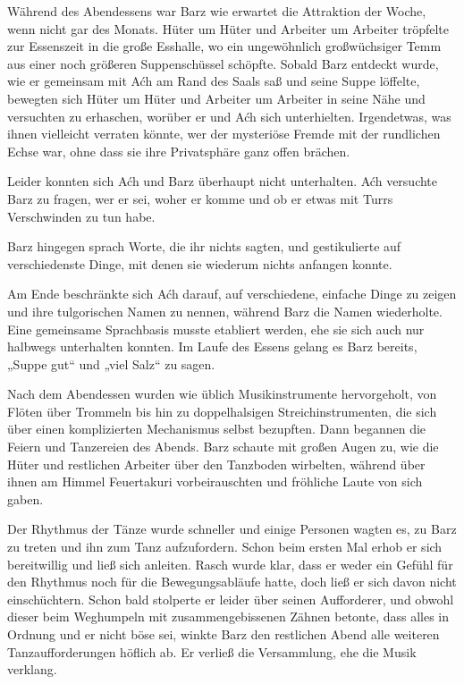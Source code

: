 Während des Abendessens war Barz wie erwartet die Attraktion der Woche, wenn nicht gar des Monats. Hüter um Hüter und Arbeiter um Arbeiter tröpfelte zur Essenszeit in die große Esshalle, wo ein ungewöhnlich großwüchsiger Temm aus einer noch größeren Suppenschüssel schöpfte. Sobald Barz entdeckt wurde, wie er gemeinsam mit Aćh am Rand des Saals saß und seine Suppe löffelte, bewegten sich Hüter um Hüter und Arbeiter um Arbeiter in seine Nähe und versuchten zu erhaschen, worüber er und Aćh sich unterhielten. Irgendetwas, was ihnen vielleicht verraten könnte, wer der mysteriöse Fremde mit der rundlichen Echse war, ohne dass sie ihre Privatsphäre ganz offen brächen.

Leider konnten sich Aćh und Barz überhaupt nicht unterhalten. Aćh versuchte Barz zu fragen, wer er sei, woher er komme und ob er etwas mit Turrs Verschwinden zu tun habe.

Barz hingegen sprach Worte, die ihr nichts sagten, und gestikulierte auf verschiedenste Dinge, mit denen sie wiederum nichts anfangen konnte.

Am Ende beschränkte sich Aćh darauf, auf verschiedene, einfache Dinge zu zeigen und ihre tulgorischen Namen zu nennen, während Barz die Namen wiederholte. Eine gemeinsame Sprachbasis musste etabliert werden, ehe sie sich auch nur halbwegs unterhalten konnten. Im Laufe des Essens gelang es Barz bereits, „Suppe gut“ und „viel Salz“ zu sagen.

Nach dem Abendessen wurden wie üblich Musikinstrumente hervorgeholt, von Flöten über Trommeln bis hin zu doppelhalsigen Streichinstrumenten, die sich über einen komplizierten Mechanismus selbst bezupften. Dann begannen die Feiern und Tanzereien des Abends. Barz schaute mit großen Augen zu, wie die Hüter und restlichen Arbeiter über den Tanzboden wirbelten, während über ihnen am Himmel Feuertakuri vorbeirauschten und fröhliche Laute von sich gaben.

Der Rhythmus der Tänze wurde schneller und einige Personen wagten es, zu Barz zu treten und ihn zum Tanz aufzufordern. Schon beim ersten Mal erhob er sich bereitwillig und ließ sich anleiten. Rasch wurde klar, dass er weder ein Gefühl für den Rhythmus noch für die Bewegungsabläufe hatte, doch ließ er sich davon nicht einschüchtern. Schon bald stolperte er leider über seinen Aufforderer, und obwohl dieser beim Weghumpeln mit zusammengebissenen Zähnen betonte, dass alles in Ordnung und er nicht böse sei, winkte Barz den restlichen Abend alle weiteren Tanzaufforderungen höflich ab. Er verließ die Versammlung, ehe die Musik verklang.

